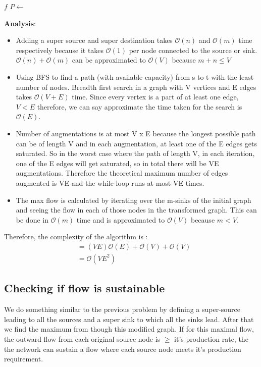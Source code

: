 \documentclass{article}
\begin{document}
\begin{algorithmic}
	\State {} $f$
		\State $P \gets $ 
		\State {}
		\State {}
		\State {}
	\EndWhile
\EndFunction
\end{algorithmic}

\textbf{Analysis}: 
\begin{itemize}
\item Adding a super source and super destination takes $\mathcal{O}(n)$ and $\mathcal{O}(m)$ time respectively because it takes $\mathcal{O}(1)$ per node connected to the source or sink. $\mathcal{O}(n) + \mathcal{O}(m)$ can be approximated to $\mathcal{O}(V)$ because $m+n \leq V$
\item Using BFS to find a path (with available capacity) from s to t with the least number of nodes. Breadth first search in a graph with V vertices and E edges takes $\mathcal{O}(V+E)$ time. Since every vertex is a part of at least one edge,  $V < E$ therefore, we can say approximate the time taken for the search is $\mathcal{O}(E)$.
\item Number of augmentations is at most V x E because the longest possible path can be of length V and in each augmentation, at least one of the E edges gets saturated. So in the worst case where the path of length V, in each iteration, one of the E edges will get saturated, so in total there will be VE augmentations. Therefore the theoretical maximum number of edges augmented is VE and the while loop runs at most VE times.
\item The max flow is calculated by iterating over the m-sinks of the initial graph and seeing the flow in each of those nodes in the transformed graph. This can be done in $\mathcal{O}(m)$ time and is approximated to $\mathcal{O}(V)$ because $m < V$.
\end{itemize}

Therefore, the complexity of the algorithm is :
\begin{align*}
 & = (VE)\mathcal{O}(E) + \mathcal{O}(V) + \mathcal{O}(V) \\
 & = \mathcal{O}(VE^2)
\end{align*}

\subsection{Checking if flow is sustainable}
We do something similar to the previous problem by defining a super-source leading to all the sources and a super sink to which all the sinks lead. After that we find the maximum from though this modified graph. If for this maximal flow, the outward flow from each original source node is $\geq$ it's production rate, the the network can sustain a flow where each source node meets it's production requirement. 
\end{document}
